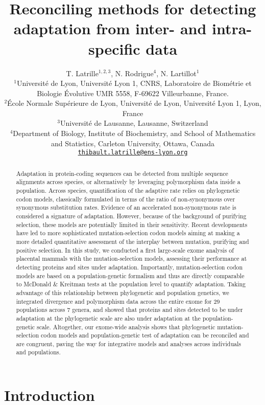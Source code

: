 \documentclass{article}
\title{Reconciling methods for detecting adaptation from inter- and intra-specific data}
\author{
    \large
    T. {Latrille}$^{1,2,3}$, N. {Rodrigue}$^{4}$, N. {Lartillot}$^{1}$\\
    \normalsize
    $^{1}$Université de Lyon, Université Lyon 1, CNRS, Laboratoire de Biométrie et Biologie Évolutive UMR 5558, F-69622 Villeurbanne, France.\\
    $^{2}$École Normale Supérieure de Lyon, Université de Lyon, Université Lyon 1, Lyon, France\\
    $^{3}$Université de Lausanne, Lausanne, Switzerland\\
    $^{4}$Department of Biology, Institute of Biochemistry, and School of Mathematics and Statistics, Carleton University, Ottawa, Canada \\
    \texttt{\href{mailto:thibault.latrille@ens-lyon.org}{thibault.latrille@ens-lyon.org}} \\
}
\begin{document}
    \maketitle

    \begin{abstract}
        Adaptation in protein-coding sequences can be detected from multiple sequence alignments across species, or alternatively by leveraging polymorphism data inside a population.
        Across species, quantification of the adaptive rate relies on phylogenetic codon models, classically formulated in terms of the ratio of non-synonymous over synonymous substitution rates.
        Evidence of an accelerated non-synonymous rate is considered a signature of adaptation.
        However, because of the background of purifying selection, these models are potentially limited in their sensitivity.
        Recent developments have led to more sophisticated mutation-selection codon models aiming at making a more detailed quantitative assessment of the interplay between mutation, purifying and positive selection.
        In this study, we conducted a first large-scale exome analysis of placental mammals with the mutation-selection models, assessing their performance at detecting proteins and sites under adaptation.
        Importantly, mutation-selection codon models are based on a population-genetic formalism and thus are directly comparable to McDonald \& Kreitman tests at the population level to quantify adaptation.
        Taking advantage of this relationship between phylogenetic and population genetics, we integrated divergence and polymorphism data across the entire exome for 29 populations across 7 genera, and showed that proteins and sites detected to be under adaptation at the phylogenetic scale are also under adaptation at the population-genetic scale.
        Altogether, our exome-wide analysis shows that phylogenetic mutation-selection codon models and population-genetic test of adaptation can be reconciled and are congruent, paving the way for integrative models and analyses across individuals and populations.
    \end{abstract}


    \section*{Introduction}
\end{document}
